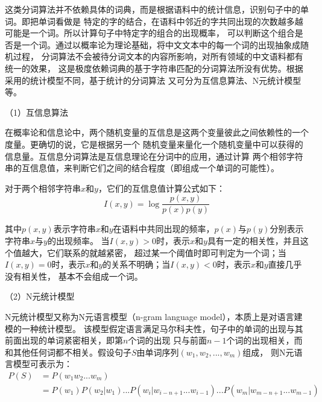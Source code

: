这类分词算法并不依赖具体的词典，而是根据语料中的统计信息，识别句子中的单词。即把单词看做是
特定的字的结合，在语料中邻近的字共同出现的次数越多越可能是一个词。所以计算句子中特定字的组合的出现概率，
可以判断这个组合是否是一个词。通过以概率论为理论基础，将中文文本中的每一个词的出现抽象成随机过程，
分词算法不会被待分词文本的内容所影响，对所有领域的中文语料都有统一的效果，
这是极度依赖词典的基于字符串匹配的分词算法所没有优势。根据采用的统计模型不同，基于统计的分词算法
又可分为互信息算法、N元统计模型等。

（1）互信息算法

在概率论和信息论中，两个随机变量的互信息是这两个变量彼此之间依赖性的一个度量。更确切的说，它是根据另一个
随机变量来量化一个随机变量中可以获得的信息量。互信息分词算法是互信息理论在分词中的应用，通过计算
两个相邻字符串的互信息值，来判断它们之间的结合程度（即组成一个单词的可能性）。

对于两个相邻字符串$x$和$y$，它们的互信息值计算公式如下：
\begin{equation}
    I\left ( x,y \right )=\log \frac{p\left ( x,y \right )}{p\left ( x \right )p\left ( y \right )}
\end{equation}

其中$p\left ( x,y \right )$表示字符串$x$和$y$在语料中共同出现的频率，$p\left ( x \right )$与$p\left ( y \right )$分别表示字符串$x$与$y$的出现频率。
当$I\left ( x,y \right )>0$时，表示$x$和$y$具有一定的相关性，并且这个值越大，它们联系的就越紧密，
超过某一个阈值时即可判定为一个词；当$I\left ( x,y \right )=0$时，表示$x$和$y$的关系不明确；当$I\left ( x,y \right )<0$时，表示$x$和$y$直接几乎没有相关性，
基本不会组成一个词。

（2）N元统计模型

N元统计模型又称为N元语言模型（n-gram language model），本质上是对语言建模的一种统计模型。
该模型假定语言满足马尔科夫性，句子中的单词的出现与其前面出现的单词紧密相关，即第$n$个词的出现
只与前面$n-1$个词的出现相关，而和其他任何词都不相关。假设句子$S$由单词序列$\left (w_1,w_2,...,w_m  \right )$组成，
则N元语言模型可表示为：
\begin{equation}
    \begin{aligned}
        P\left ( S \right )&=P\left ( w_1w_2...w_m \right )\\
        &=P\left ( w_1 \right )P\left ( w_2|w_1 \right )...
P\left ( w_i|w_{i-n+1}...w_{i-1} \right )...P\left ( w_m|w_{m-n+1}...w_{m-1} \right )
    \end{aligned}
    \label{n-gram}
\end{equation}

